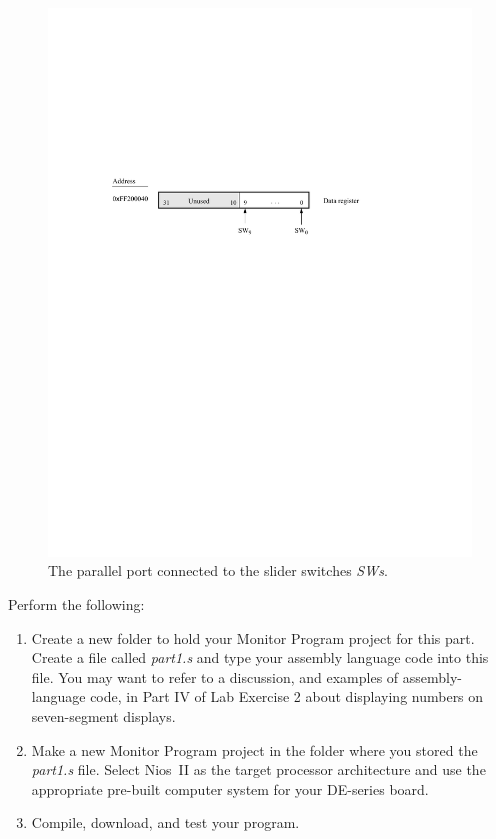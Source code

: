 \documentclass[epsfig,10pt,fullpage]{article}
\begin{document}
\begin{figure}[H]
	\begin{center}
	\includegraphics[scale=.9]{figures/figureSW.pdf}
	\end{center}
	\caption{The parallel port connected to the slider switches {\it SWs}.}
\label{fig:SW}
\end{figure}

Perform the following:

\begin{enumerate}
\item Create a new folder to hold your Monitor Program project for this part. Create a
file called {\it part1.s} and type your assembly language code into this file.
You may want to refer to a discussion, and examples of assembly-language code,
in Part IV of Lab Exercise 2 about displaying numbers on seven-segment displays.

\item
Make a new Monitor Program project in the folder where you stored the {\it part1.s} file.
Select Nios~II as the target processor architecture and use the appropriate pre-built 
computer system for your DE-series board.

\item
Compile, download, and test your program. 
\end{enumerate}
\end{document}
